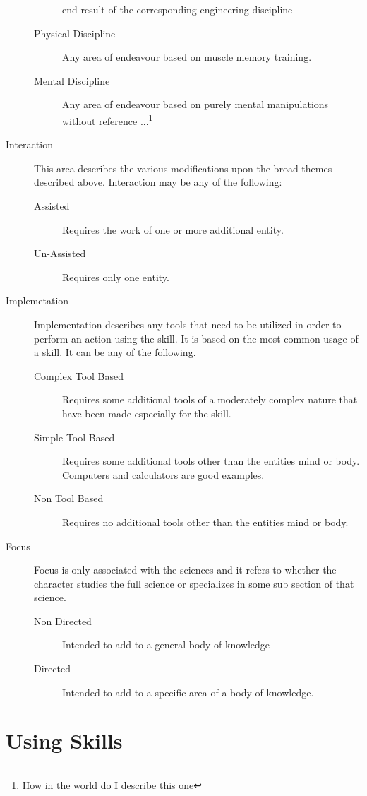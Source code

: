 \begin{description}
\begin{description}
		end result of the corresponding engineering discipline
		\item[Physical Discipline]
		Any area of endeavour based on muscle memory training.
		\item[Mental Discipline]
		Any area of endeavour based on purely mental manipulations without 
		reference ...\footnote{How in the world do I describe this one}
		\end{description}
		\item[Interaction]
		This area describes the various modifications upon the broad themes
		described above. Interaction may be any of the following:
		\begin{description}
			\item[Assisted]
			Requires the work of one or more additional entity.
			\item[Un-Assisted]
			Requires only one entity.
		\end{description}
	\item[Implemetation]
	Implementation describes any tools that need to be utilized in order 
	to perform an action using the skill. It is based on the most common
	usage of a skill. It can be any of the following.
	\begin{description}
		\item[Complex Tool Based]
		Requires some additional tools of a moderately complex nature that have been
		made especially for the skill.
		\item[Simple Tool Based]
		Requires some additional tools other than the entities mind or body. 
		Computers and calculators are good examples.
		\item[Non Tool Based]
		Requires no additional tools other than the entities mind or body.
	\end{description}
	\item[Focus]
	Focus is only associated with the sciences and it refers to whether 
	the character studies the full science or specializes in some sub 
	section of that science.
	\begin{description}
		\item[Non Directed]
		Intended to add to a general body of knowledge
		\item[Directed]
		Intended to add to a specific area of a body of knowledge.
	\end{description}
\end{description}

\section{Using Skills}
